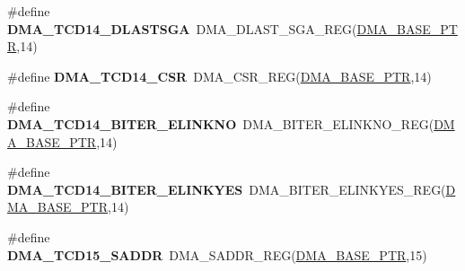 \begin{DoxyCompactItemize}
\item 
\hypertarget{group___d_m_a___register___accessor___macros_ga7a9291c9148fe72fcaa6daf2a8fdd83e}{}\#define {\bfseries D\+M\+A\+\_\+\+T\+C\+D14\+\_\+\+D\+L\+A\+S\+T\+S\+G\+A}~D\+M\+A\+\_\+\+D\+L\+A\+S\+T\+\_\+\+S\+G\+A\+\_\+\+R\+E\+G(\hyperlink{group___d_m_a___peripheral_ga6997fbc1b1973e9f27170217a3bd6f22}{D\+M\+A\+\_\+\+B\+A\+S\+E\+\_\+\+P\+T\+R},14)\label{group___d_m_a___register___accessor___macros_ga7a9291c9148fe72fcaa6daf2a8fdd83e}

\item 
\hypertarget{group___d_m_a___register___accessor___macros_gac1607d5f48957b2d42b1c77f4ffe1ed9}{}\#define {\bfseries D\+M\+A\+\_\+\+T\+C\+D14\+\_\+\+C\+S\+R}~D\+M\+A\+\_\+\+C\+S\+R\+\_\+\+R\+E\+G(\hyperlink{group___d_m_a___peripheral_ga6997fbc1b1973e9f27170217a3bd6f22}{D\+M\+A\+\_\+\+B\+A\+S\+E\+\_\+\+P\+T\+R},14)\label{group___d_m_a___register___accessor___macros_gac1607d5f48957b2d42b1c77f4ffe1ed9}

\item 
\hypertarget{group___d_m_a___register___accessor___macros_ga9798a8bd49bf56c6247968ec1847ba56}{}\#define {\bfseries D\+M\+A\+\_\+\+T\+C\+D14\+\_\+\+B\+I\+T\+E\+R\+\_\+\+E\+L\+I\+N\+K\+N\+O}~D\+M\+A\+\_\+\+B\+I\+T\+E\+R\+\_\+\+E\+L\+I\+N\+K\+N\+O\+\_\+\+R\+E\+G(\hyperlink{group___d_m_a___peripheral_ga6997fbc1b1973e9f27170217a3bd6f22}{D\+M\+A\+\_\+\+B\+A\+S\+E\+\_\+\+P\+T\+R},14)\label{group___d_m_a___register___accessor___macros_ga9798a8bd49bf56c6247968ec1847ba56}

\item 
\hypertarget{group___d_m_a___register___accessor___macros_ga37d94f14acca967633fbc56dac680274}{}\#define {\bfseries D\+M\+A\+\_\+\+T\+C\+D14\+\_\+\+B\+I\+T\+E\+R\+\_\+\+E\+L\+I\+N\+K\+Y\+E\+S}~D\+M\+A\+\_\+\+B\+I\+T\+E\+R\+\_\+\+E\+L\+I\+N\+K\+Y\+E\+S\+\_\+\+R\+E\+G(\hyperlink{group___d_m_a___peripheral_ga6997fbc1b1973e9f27170217a3bd6f22}{D\+M\+A\+\_\+\+B\+A\+S\+E\+\_\+\+P\+T\+R},14)\label{group___d_m_a___register___accessor___macros_ga37d94f14acca967633fbc56dac680274}

\item 
\hypertarget{group___d_m_a___register___accessor___macros_ga6eb79f13370be67b54b5ed1fe461adc6}{}\#define {\bfseries D\+M\+A\+\_\+\+T\+C\+D15\+\_\+\+S\+A\+D\+D\+R}~D\+M\+A\+\_\+\+S\+A\+D\+D\+R\+\_\+\+R\+E\+G(\hyperlink{group___d_m_a___peripheral_ga6997fbc1b1973e9f27170217a3bd6f22}{D\+M\+A\+\_\+\+B\+A\+S\+E\+\_\+\+P\+T\+R},15)\label{group___d_m_a___register___accessor___macros_ga6eb79f13370be67b54b5ed1fe461adc6}


\end{DoxyCompactItemize}

